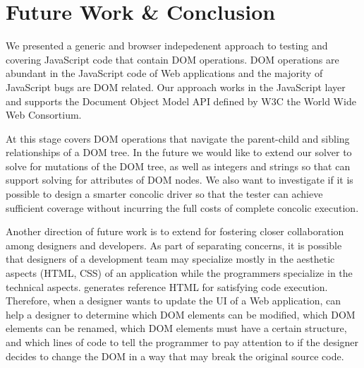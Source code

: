 \section{Future Work \& Conclusion}
We presented a generic and browser indepedenent approach to testing and covering JavaScript code that contain DOM operations.  
DOM operations are abundant in the JavaScript code of Web applications and the majority of JavaScript bugs are DOM related.  
Our approach works in the JavaScript layer and supports the Document Object Model API defined by W3C the World Wide Web Consortium.  

At this stage \tool covers DOM operations that navigate the parent-child and sibling relationships of a DOM tree.  
In the future we would like to extend our solver to solve for mutations of the DOM tree, as well as integers and strings so that \tool can support solving for attributes of DOM nodes.    
We also want to investigate if it is possible to design a smarter concolic driver so that the tester can achieve sufficient coverage without incurring the full costs of complete concolic execution.

Another direction of future work is to extend \tool for fostering closer collaboration among designers and developers.
As part of separating concerns, it is possible that designers of a development team may specialize mostly in the aesthetic aspects (HTML, CSS) of an application while the programmers specialize in the technical aspects.    
\tool generates reference HTML for satisfying code execution.  
Therefore, when a designer wants to update the UI of a Web application, \tool can help a designer to determine 
which DOM elements can be modified, 
which DOM elements can be renamed, 
which DOM elements must have a certain structure, 
and which lines of code to tell the programmer to pay attention to if the designer decides to change the DOM in a way that may break the original source code.  
